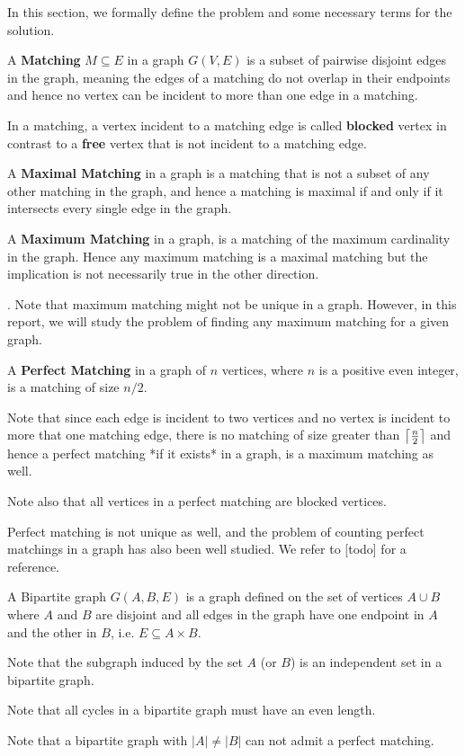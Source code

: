 In this section, we formally define the problem and some necessary terms for the solution.

\begin{definition}
A \textbf{Matching} $M \subseteq E$ in a graph $G(V, E)$ is a subset of pairwise disjoint edges in the graph, meaning the edges of a matching do not overlap in their endpoints and hence no vertex can be incident to more than one edge in a matching.
\end{definition}
In a matching, a vertex incident to a matching edge is called \textbf{blocked} vertex in contrast to a \textbf{free} vertex that is not incident to a matching edge.

\begin{definition}
A \textbf{Maximal Matching} in a graph is a matching that is not a subset of any other matching in the graph, and hence a matching is maximal if and only if it intersects every single edge in the graph.
\end{definition}

\begin{definition}
A \textbf{Maximum Matching} in a graph, is a matching of the maximum cardinality in the graph. Hence any maximum matching is a maximal matching but the implication is not necessarily true in the other direction.
\end{definition}.
Note that maximum matching might not be unique in a graph. However, in this report, we will study the problem of finding any maximum matching for a given graph.

\begin{definition}
A \textbf{Perfect Matching} in a graph of $n$ vertices, where $n$ is a positive even integer, is a matching of size $n/2$.
\end{definition}
Note that since each edge is incident to two vertices and no vertex is incident to more that one matching edge, there is no matching of size greater than $\ceil*{ \frac{n}{2}}$ and hence a perfect matching *if it exists* in a graph, is a maximum matching as well.

Note also that all vertices in a perfect matching are blocked vertices.

Perfect matching is not unique as well, and the problem of counting perfect matchings in a graph has also been well studied. We refer to [todo] for a reference.

\begin{definition}
	A Bipartite graph $G(A,B,E)$ is a graph defined on the set of vertices $A \cup B$ where $A$ and $B$ are disjoint and all edges in the graph have one endpoint in $A$ and the other in $B$, i.e. $E \subseteq A \times B$.
\end{definition}
Note that the subgraph induced by the set $A$ (or $B$) is an independent set in a bipartite graph.

Note that all cycles in a bipartite graph must have an even length.

Note that a bipartite graph with $|A| \neq |B|$ can not admit a perfect matching.

